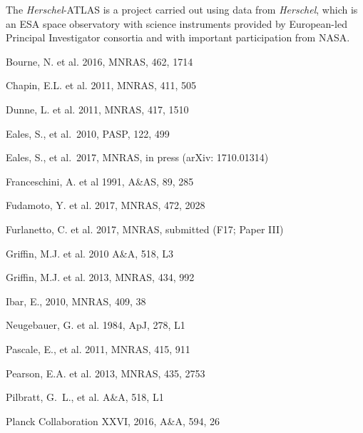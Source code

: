 \documentclass[a4paper,fleqn,usenatbib, twocolumn]{aastex61}
\def\pasp{PASP}
\begin{document}
The {\it Herschel}-ATLAS is a project carried out using data from {\it
  Herschel}, which is an ESA space observatory with science
instruments provided by European-led Principal Investigator consortia
and with important participation from NASA.

\begin{thebibliography}{}


 Bourne, N. et al. 2016, MNRAS, 462, 1714

 Chapin, E.L. et al. 2011, MNRAS, 411, 505

 Dunne, L. et al. 2011, MNRAS, 417, 1510

 Eales, S., et al.\ 2010,  \pasp, 122, 499 

 Eales, S., et al.\ 2017, MNRAS, in press
(arXiv: 1710.01314)

 Franceschini,
  A. et al 1991, A\&AS, 89, 285
  
 Fudamoto, Y. et al. 2017,
MNRAS, 472, 2028

 Furlanetto, C. et al. 2017,
MNRAS, submitted (F17; Paper III)

 Griffin, M.J. et al. 2010 A\&A, 518, L3

 Griffin, M.J. et al. 2013,
MNRAS, 434, 992

 Ibar, E., 2010, MNRAS, 409, 38

 Neugebauer, G. et al. 1984,
ApJ, 278, L1

 Pascale, E., et al. 2011, MNRAS, 415, 911 

 Pearson, E.A. et al. 2013, MNRAS, 435,
2753

 Pilbratt, G.~L., et al. A\&A, 518, L1

 Planck
  Collaboration XXVI, 2016, A\&A, 594, 26
  

\end{thebibliography}
\end{document}
